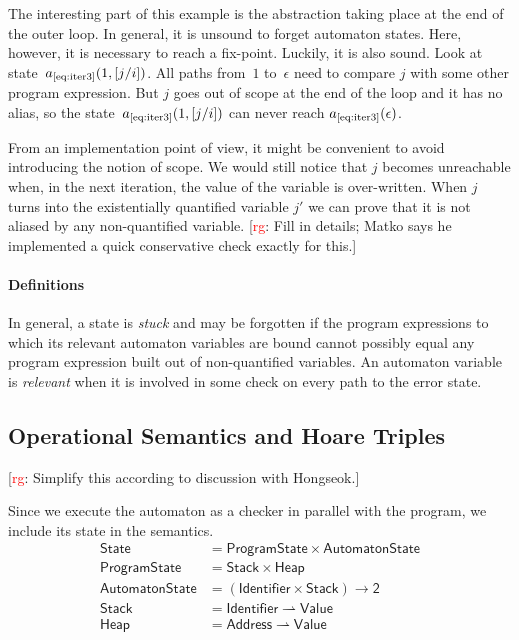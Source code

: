 \documentclass[a4paper]{article}
\newcommand{\todo}[2]{{\small [\textcolor{red}{#1}: #2]}}
\newcommand{\rg}[1]{\todo{rg}{#1}}
\newcommand{\pmap}{\rightharpoonup}
\theoremstyle{remark}
\begin{document}
The interesting part of this example is the abstraction taking place at the end of the outer loop.
In general, it is unsound to forget automaton states.
Here, however, it is necessary to reach a fix-point.
Luckily, it is also sound.
Look at state~$a_\text{\ref{eq:iter3}}(1, [j/i])$.
All paths from~$1$ to~$\epsilon$ need to compare $j$ with some other program expression.
But $j$ goes out of scope at the end of the loop and it has no alias, so the state~$a_\text{\ref{eq:iter3}}(1, [j/i])$ can never reach $a_\text{\ref{eq:iter3}}(\epsilon)$.

From an implementation point of view, it might be convenient to avoid introducing the notion of scope.
We would still notice that $j$ becomes unreachable when, in the next iteration, the value of the variable is over-written.
When $j$ turns into the existentially quantified variable $j'$ we can prove that it is not aliased by any non-quantified variable.
\rg{Fill in details; Matko says he implemented a quick conservative check exactly for this.}

\paragraph{Definitions}
In general, a state is \emph{stuck} and may be forgotten if the program expressions to which its relevant automaton variables are bound cannot possibly equal any program expression built out of non-quantified variables.
An automaton variable is \emph{relevant} when it is involved in some check on every path to the error state.

\subsection{Operational Semantics and Hoare Triples}\label{sec:opsem} %

\rg{Simplify this according to discussion with Hongseok.}

Since we execute the automaton as a checker in parallel with the program, we include its state in the semantics.
\begin{align}
\mathsf{State}&=\mathsf{ProgramState}\times\mathsf{AutomatonState} \\
\mathsf{ProgramState}&=\mathsf{Stack}\times\mathsf{Heap} \\
\mathsf{AutomatonState}&=
  (\mathsf{Identifier}\times\mathsf{Stack})\to\mathsf{2} \\
\mathsf{Stack}&=\mathsf{Identifier}\pmap\mathsf{Value} \\
\mathsf{Heap}&=\mathsf{Address}\pmap\mathsf{Value}
\end{align}
\end{document}
